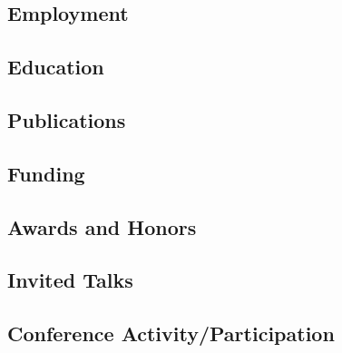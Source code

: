 \documentclass[11pt]{article}
\begin{document}


\begin{center}

\end{center}

\subsection*{Employment}


\subsection*{Education}


\subsection*{Publications}


\subsection*{Funding}


\subsection*{Awards and Honors}


\subsection*{Invited Talks}


\subsection*{Conference Activity/Participation}


%









%
\end{document}
